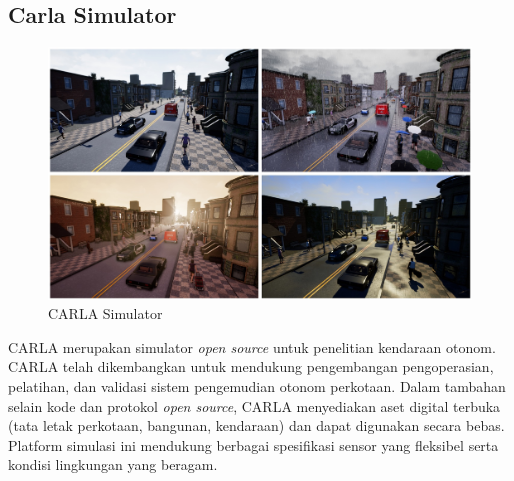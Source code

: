 \subsection{Carla Simulator}
\begin{figure}[H] 
	\centering
	\includegraphics[width=.4\linewidth]{images/carlasim}
	\caption{CARLA Simulator}
	\label{fig:carlasim}
\end{figure}
CARLA merupakan simulator \textit{open source }untuk penelitian kendaraan otonom. CARLA telah dikembangkan untuk mendukung pengembangan pengoperasian, pelatihan, dan validasi sistem pengemudian otonom perkotaan. Dalam tambahan selain kode dan protokol \textit{open source}, CARLA menyediakan aset digital terbuka (tata letak perkotaan, bangunan, kendaraan) dan dapat digunakan secara bebas. Platform simulasi ini mendukung berbagai spesifikasi sensor yang fleksibel serta kondisi lingkungan yang beragam. \cite{cit:carlasim}

